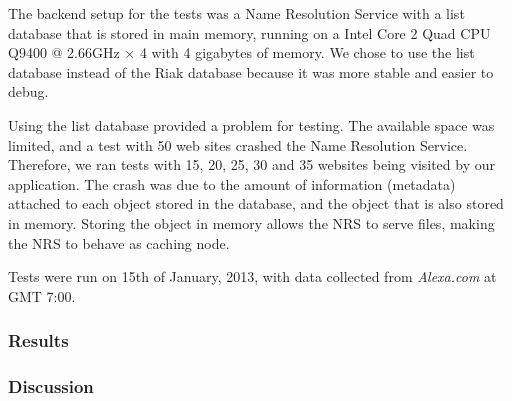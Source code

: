 The backend setup for the tests was a Name Resolution Service with a list database that is stored in main memory, running on a Intel Core 2 Quad CPU Q9400 @ 2.66GHz × 4 with 4 gigabytes of memory. We chose to use the list database instead of the Riak database because it was more stable and easier to debug.

Using the list database provided a problem for testing. The available space was limited, and a test with 50 web sites crashed the Name Resolution Service. Therefore, we ran tests with 15, 20, 25, 30 and 35 websites being visited by our application. The crash was due to the amount of information (metadata) attached to each object stored in the database, and the object that is also stored in memory. Storing the object in memory allows the NRS to serve files, making the NRS to behave as caching node.

Tests were run on 15th of January, 2013, with data collected from \textit{Alexa.com} at GMT 7:00.

\subsubsection{Results}

\subsubsection{Discussion}
